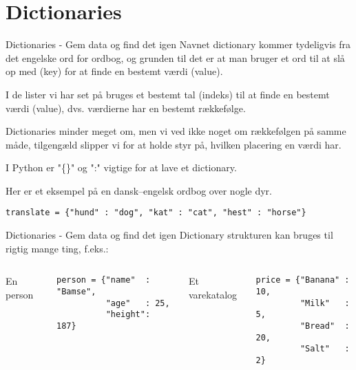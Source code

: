\section{Dictionaries}

\begin{frame}[fragile]{Dictionaries - Gem data og find det igen}
	Navnet dictionary kommer tydeligvis fra det engelske ord for ordbog, og grunden til det er at man bruger et ord til at slå op med (key) for at finde en bestemt værdi (value). 
	
	\pause
	
	I de lister vi har set på bruges et bestemt tal (indeks) til at finde en bestemt værdi (value), dvs. værdierne har en bestemt rækkefølge.
	
	\pause
	
	Dictionaries minder meget om, men vi ved ikke noget om rækkefølgen på samme måde, tilgengæld slipper vi for at holde styr på, hvilken placering en værdi har.
	\pause
	
	I Python er "\{\}" og ":" vigtige for at lave et dictionary.
	
	Her er et eksempel på en dansk--engelsk ordbog over nogle dyr.
	\begin{lstlisting}[style=python]
translate = {"hund" : "dog", "kat" : "cat", "hest" : "horse"}
	\end{lstlisting}
\end{frame}

\begin{frame}[fragile]{Dictionaries - Gem data og find det igen}
Dictionary strukturen kan bruges til rigtig mange ting, f.eks.:

\medskip

\pause

\begin{columns}
	En person
	\begin{lstlisting}[style=python]
person = {"name"  : "Bamse",
          "age"   : 25,
          "height": 187}
	\end{lstlisting}
	
	\pause
	
	Et varekatalog
	\begin{lstlisting}[style=python]
price = {"Banana" : 10,
         "Milk"   : 5,
         "Bread"  : 20,
         "Salt"   : 2}
	\end{lstlisting}
\end{columns}	

\end{frame}

